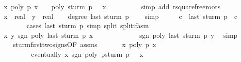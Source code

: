 \begin{isabellebody}
\ {\isachardoublequoteopen}{\isasymAnd}x{\isachardot}\ {\isasymnot}{\isacharparenleft}poly\ p\ x\ {\isacharequal}\ {}\ {\isasymand}\ poly\ {\isacharparenleft}sturm\ p\ {\isacharbang}\ {}{\isacharparenright}\ x\ {\isacharequal}\ {}{\isacharparenright}{\isachardoublequoteclose}\isanewline
\ \ \ \ \ \ \isamarkupfalse%
\ {\isacharparenleft}simp\ add{\isacharcolon}\ rsquarefree{\isacharunderscore}roots{\isacharparenright}\isanewline
{}\isamarkupfalse%
\isanewline
\ \ \isamarkupfalse%
\ x\ {\isacharcolon}{\isacharcolon}\ real\ \ y\ {\isacharcolon}{\isacharcolon}\ real\isanewline
\ \ \isamarkupfalse%
\ {\isachardoublequoteopen}degree\ {\isacharparenleft}last\ {\isacharparenleft}sturm\ p{\isacharparenright}{\isacharparenright}\ {\isacharequal}\ {}{\isachardoublequoteclose}\ \isamarkupfalse%
\ simp\isanewline
\ \ \isamarkupfalse%
\ \isamarkupfalse%
\ c\ \ {\isachardoublequoteopen}last\ {\isacharparenleft}sturm\ p{\isacharparenright}\ {\isacharequal}\ {\isacharbrackleft}{\isacharcolon}c{\isacharcolon}{\isacharbrackright}{\isachardoublequoteclose}\ \isanewline
\ \ \ \ \ \ \isamarkupfalse%
\ {\isacharparenleft}cases\ {\isachardoublequoteopen}last\ {\isacharparenleft}sturm\ p{\isacharparenright}{\isachardoublequoteclose}{\isacharcomma}\ simp\ split{\isacharcolon}\ split{\isacharunderscore}if{\isacharunderscore}asm{\isacharparenright}\isanewline
\ \ \isamarkupfalse%
\ {\isachardoublequoteopen}{\isasymAnd}x\ y{\isachardot}\ sgn\ {\isacharparenleft}poly\ {\isacharparenleft}last\ {\isacharparenleft}sturm\ p{\isacharparenright}{\isacharparenright}\ x{\isacharparenright}\ {\isacharequal}\isanewline
\ \ \ \ \ \ \ \ \ \ \ \ sgn\ {\isacharparenleft}poly\ {\isacharparenleft}last\ {\isacharparenleft}sturm\ p{\isacharparenright}{\isacharparenright}\ y{\isacharparenright}{\isachardoublequoteclose}\ \isamarkupfalse%
\ simp\isanewline
{}\isamarkupfalse%
\isanewline
\ \ \isamarkupfalse%
\ sturm{\isacharunderscore}firsttwo{\isacharunderscore}signs{\isacharbrackleft}OF\ assms{\isacharbrackright}\ \isanewline
\ \ \ \ \isamarkupfalse%
\ {\isachardoublequoteopen}{\isasymAnd}x\ poly\ p\ x\ {\isacharequal}\ {}\ {\isasymLongrightarrow}\isanewline
\ \ \ \ \ \ \ \ \ eventually\ {\isacharparenleft}{\isasymlambda}x{\isachardot}\ sgn\ {\isacharparenleft}poly\ {\isacharparenleft}p{\isacharasterisk}sturm\ p\ {\isacharbang}\ {}{\isacharparenright}\ x{\isacharparenright}\ {\isacharequal}\ \isanewline

\end{isabellebody}
